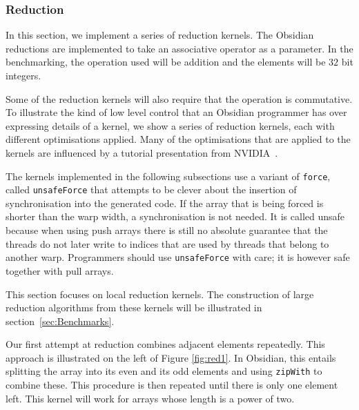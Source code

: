 \subsubsection{Reduction}  
\label{sec:redOpt}



In this section, we implement a series of reduction kernels. The Obsidian 
reductions are implemented to take an associative operator as a parameter. 
In the benchmarking, the operation used will be addition and the elements 
will be $32$ bit integers. 


Some of the reduction 
kernels will also require that the operation is commutative. 
To illustrate the kind of low level control that an 
Obsidian programmer has over expressing details of a kernel, we show a series 
of reduction kernels, each with different optimisations applied. Many of the 
optimisations that are applied to the kernels are influenced by a 
tutorial presentation from NVIDIA~\cite{reduction}.



The kernels implemented in the following subsections use a variant of {\tt force}, 
called {\tt unsafeForce} that attempts to be clever about the insertion 
of synchronisation into the generated code. If the array that is being forced 
is shorter than the warp width, a synchronisation is not needed. It is called 
unsafe because when using push arrays there is still no absolute guarantee 
that the threads do not later write to indices that are used by threads that belong to another 
warp. Programmers should use {\tt unsafeForce} with care; it 
is however safe together with pull arrays. 

This section focuses on local reduction kernels. The construction of large 
reduction algorithms from these kernels will be illustrated in 
section~\ref{sec:Benchmarks}. 


Our first attempt at reduction combines adjacent elements repeatedly.
This approach is illustrated on the left of Figure \ref{fig:red1}. 
In Obsidian, this entails splitting the array into its even and its odd elements and using {\tt zipWith} to combine these. 
This procedure is then repeated until there is only one element left. This 
kernel will work for arrays whose length is a power of two. 

